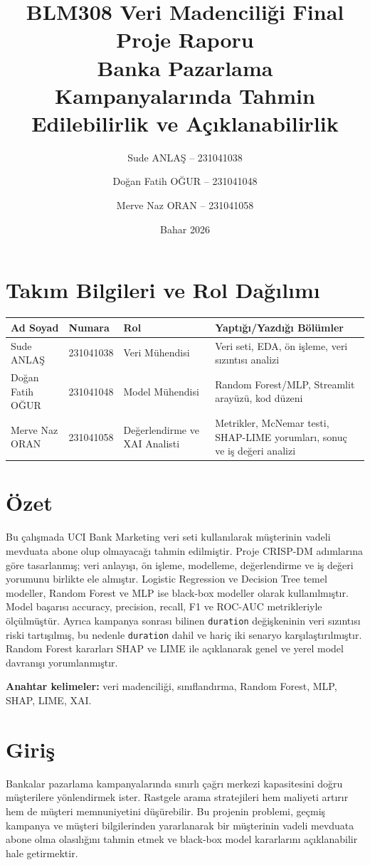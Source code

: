 \documentclass[11pt,a4paper]{article}
\title{\textbf{BLM308 Veri Madenciliği Final Proje Raporu}\\Banka Pazarlama Kampanyalarında Tahmin Edilebilirlik ve Açıklanabilirlik}
\author{Sude ANLAŞ -- 231041038 \and Doğan Fatih OĞUR -- 231041048 \and Merve Naz ORAN -- 231041058}
\date{Bahar 2026}
\begin{document}
\maketitle
\tableofcontents
\newpage

\section*{Takım Bilgileri ve Rol Dağılımı}
\begin{longtable}{p{3cm}p{2.3cm}p{4cm}p{6cm}}
\toprule
Ad Soyad & Numara & Rol & Yaptığı/Yazdığı Bölümler\\
\midrule
Sude ANLAŞ & 231041038 & Veri Mühendisi & Veri seti, EDA, ön işleme, veri sızıntısı analizi\\
Doğan Fatih OĞUR & 231041048 & Model Mühendisi & Random Forest/MLP, Streamlit arayüzü, kod düzeni\\
Merve Naz ORAN & 231041058 & Değerlendirme ve XAI Analisti & Metrikler, McNemar testi, SHAP-LIME yorumları, sonuç ve iş değeri analizi\\
\bottomrule
\end{longtable}

\section*{Özet}
Bu çalışmada UCI Bank Marketing veri seti kullanılarak müşterinin vadeli mevduata abone olup olmayacağı tahmin edilmiştir. Proje CRISP-DM adımlarına göre tasarlanmış; veri anlayışı, ön işleme, modelleme, değerlendirme ve iş değeri yorumunu birlikte ele almıştır. Logistic Regression ve Decision Tree temel modeller, Random Forest ve MLP ise black-box modeller olarak kullanılmıştır. Model başarısı accuracy, precision, recall, F1 ve ROC-AUC metrikleriyle ölçülmüştür. Ayrıca kampanya sonrası bilinen \texttt{duration} değişkeninin veri sızıntısı riski tartışılmış, bu nedenle \texttt{duration} dahil ve hariç iki senaryo karşılaştırılmıştır. Random Forest kararları SHAP ve LIME ile açıklanarak genel ve yerel model davranışı yorumlanmıştır.

\textbf{Anahtar kelimeler:} veri madenciliği, sınıflandırma, Random Forest, MLP, SHAP, LIME, XAI.

\section{Giriş}
Bankalar pazarlama kampanyalarında sınırlı çağrı merkezi kapasitesini doğru müşterilere yönlendirmek ister. Rastgele arama stratejileri hem maliyeti artırır hem de müşteri memnuniyetini düşürebilir. Bu projenin problemi, geçmiş kampanya ve müşteri bilgilerinden yararlanarak bir müşterinin vadeli mevduata abone olma olasılığını tahmin etmek ve black-box model kararlarını açıklanabilir hale getirmektir.
\end{document}
